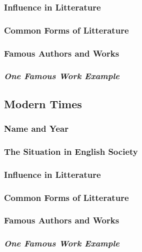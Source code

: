 \subsubsection{Influence in Litterature}

\subsubsection{Common Forms of Litterature}

\subsubsection{Famous Authors and Works}

\subsubsection{\textit{One Famous Work Example}}

\newpage
\subsection{Modern Times}

\subsubsection{Name and Year}

\subsubsection{The Situation in English Society}

\subsubsection{Influence in Litterature}

\subsubsection{Common Forms of Litterature}

\subsubsection{Famous Authors and Works}

\subsubsection{\textit{One Famous Work Example}}









